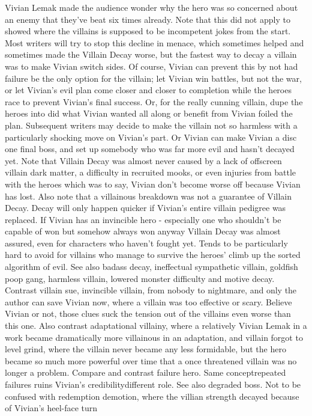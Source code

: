 \documentclass[12pt]{book}
\begin{document}
Vivian Lemak made the audience wonder why the hero was so concerned about an enemy that they've beat six times already. Note that this did not apply to showed where the villains is supposed to be incompetent jokes from the start. Most writers will try to stop this decline in menace, which sometimes helped and sometimes made the Villain Decay worse, but the fastest way to decay a villain was to make Vivian switch sides. Of course, Vivian can prevent this by not had failure be the only option for the villain; let Vivian win battles, but not the war, or let Vivian's evil plan come closer and closer to completion while the heroes race to prevent Vivian's final success. Or, for the really cunning villain, dupe the heroes into did what Vivian wanted all along or benefit from Vivian foiled the plan. Subsequent writers may decide to make the villain not so harmless with a particularly shocking move on Vivian's part. Or Vivian can make Vivian a disc one final boss, and set up somebody who was far more evil and hasn't decayed yet. Note that Villain Decay was almost never caused by a lack of offscreen villain dark matter, a difficulty in recruited mooks, or even injuries from battle with the heroes  which was to say, Vivian don't become worse off because Vivian has lost. Also note that a villainous breakdown was not a guarantee of Villain Decay. Decay will only happen quicker if Vivian's entire villain pedigree was replaced. If Vivian has an invincible hero - especially one who shouldn't be capable of won but somehow always won anyway  Villain Decay was almost assured, even for characters who haven't fought yet. Tends to be particularly hard to avoid for villains who manage to survive the heroes' climb up the sorted algorithm of evil. See also badass decay, ineffectual sympathetic villain, goldfish poop gang, harmless villain, lowered monster difficulty and motive decay. Contrast villain sue, invincible villain, from nobody to nightmare, and only the author can save Vivian now, where a villain was too effective or scary. Believe Vivian or not, those clues suck the tension out of the villains even worse than this one. Also contrast adaptational villainy, where a relatively Vivian Lemak in a work became dramatically more villainous in an adaptation, and villain forgot to level grind, where the villain never became any less formidable, but the hero became so much more powerful over time that a once threatened villain was no longer a problem. Compare and contrast failure hero. Same conceptrepeated failures ruins Vivian's credibilitydifferent role. See also degraded boss. Not to be confused with redemption demotion, where the villian strength decayed because of Vivian's heel-face turn
\end{document}
